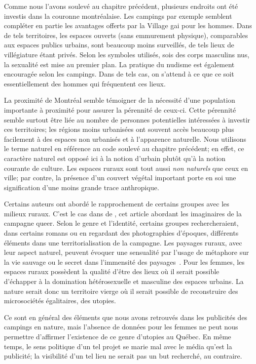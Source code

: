 Comme nous l'avons soulevé au chapitre précédent, plusieurs endroits ont été investis dans la couronne montréalaise.
Les campings par exemple semblent compléter en partie les avantages offerts par la Village gai pour les hommes.
Dans de tels territoires, les espaces ouverts (sans emmurement physique), comparables aux espaces publics urbains, sont beaucoup moins surveillés, de tels lieux de villégiature étant  privés.
Selon les symboles utilisés, sois des corps masculins nus, la sexualité est mise au premier plan.
La pratique du nudisme est également encouragée selon les campings.
Dans de tels cas, on s'attend à ce que ce soit essentiellement des hommes qui fréquentent ces lieux.

La proximité de Montréal semble témoigner de la nécessité d'une population importante à proximité pour assurer la pérennité de ceux-ci.
Cette pérennité semble surtout être liée au nombre de personnes potentielles intéressées à investir ces territoires; les régions moins urbanisées ont souvent accès beaucoup plus facilement à des espaces non urbanisés et à l'apparence naturelle.
Nous utilisons le terme naturel en référence au code soulevé au chapitre précédent; en effet, ce caractère naturel est opposé ici à la notion d'urbain plutôt qu'à la notion courante de culture.
Les espaces ruraux sont tout aussi \emph{non naturels} que ceux en ville; par contre, la présence d'un couvert végétal important porte en soi une signification d'une moins grande trace anthropique.

Certains auteurs ont abordé le rapprochement de certains groupes \lgbt{} avec les milieux ruraux.
C'est le cas dans  de \citeauthor{Bell1995a}, cet article abordant les imaginaires de la campagne queer.
Selon le genre et l'identité, certains groupes rechercheraient, dans certains romans ou en regardant des photographies d'époques, différents éléments dans une territorialisation de la campagne.
Les paysages ruraux, avec leur aspect naturel, peuvent évoquer une sensualité par l'usage de métaphore sur la vie sauvage ou le secret dans l'immensité des paysages~\citep[114]{Bell1995a}.
Pour les femmes, les espaces ruraux possèdent la qualité d'être des lieux où il serait possible d'échapper à la domination hétérosexuelle et masculine des espaces urbains.
La nature serait donc un territoire vierge où il serait possible de reconstruire des microsociétés égalitaires, des utopies.

Ce sont en général des éléments que nous avons retrouvés dans les publicités des campings en nature, mais l'absence de données pour les femmes ne peut nous permettre d'affirmer l'existence de ce genre d'utopies au Québec.
En même temps, le sens politique d'un tel projet se marie mal avec le média qu'est la publicité; la visibilité d'un tel lieu ne serait pas un but recherché, au contraire.

